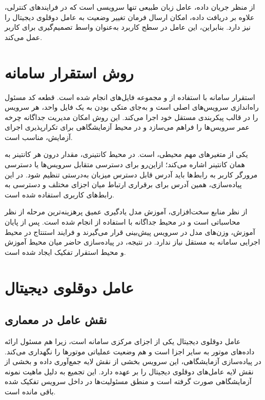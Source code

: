 از منظر جریان داده، عامل زبان طبیعی تنها سرویسی است که در فرایندهای کنترلی، علاوه بر دریافت داده، امکان ارسال فرمان تغییر وضعیت به عامل دوقلوی دیجیتال را نیز دارد. بنابراین، این عامل در سطح کاربرد به‌عنوان واسط تصمیم‌گیری برای کاربر عمل می‌کند.



\section{روش استقرار سامانه}
\label{sec:deployment}

استقرار سامانه با استفاده از  و مجموعه فایل‌های  انجام شده است. قطعه کد  مسئول راه‌اندازی سرویس‌های اصلی است و به‌جای متکی بودن به یک فایل واحد، هر سرویس را در قالب پیکربندی مستقل خود اجرا می‌کند. این روش امکان مدیریت جداگانه چرخه عمر سرویس‌ها را فراهم می‌سازد و در محیط آزمایشگاهی برای تکرارپذیری اجرای آزمایش، مناسب است.

یکی از متغیرهای مهم محیطی،  است. در محیط کانتینری، مقدار  درون هر کانتینر به همان کانتینر اشاره می‌کند؛ ازاین‌رو برای دسترسی متقابل سرویس‌ها یا دسترسی مرورگر کاربر به رابط‌ها باید آدرس قابل دسترس میزبان به‌درستی تنظیم شود. در این پیاده‌سازی، همین آدرس برای برقراری ارتباط میان اجزای مختلف و دسترسی به رابط‌های کاربری استفاده شده است.

از نظر منابع سخت‌افزاری، آموزش مدل یادگیری عمیق پرهزینه‌ترین مرحله از نظر محاسباتی است و در محیط جداگانه با استفاده از  انجام شده است. پس از پایان آموزش، وزن‌های مدل در سرویس پیش‌بینی قرار می‌گیرند و فرایند استنتاج در محیط اجرایی سامانه به  مستقل نیاز ندارد. در نتیجه، در پیاده‌سازی حاضر میان محیط آموزش و محیط استقرار تفکیک ایجاد شده‌ است.


\section{عامل دوقلوی دیجیتال}
\label{sec:impl-dtwin}

\subsection{نقش عامل در معماری}

عامل دوقلوی دیجیتال یکی از اجزای مرکزی سامانه است، زیرا هم مسئول ارائه داده‌های موتور به سایر اجزا است و هم وضعیت عملیاتی موتورها را نگهداری می‌کند. در پیاده‌سازی آزمایشگاهی، این سرویس بخشی از نقش لایه جمع‌آوری داده و بخشی از نقش لایه عامل‌های دوقلوی دیجیتال را بر عهده دارد. این تجمیع به دلیل ماهیت نمونه آزمایشگاهی صورت گرفته است و منطق مسئولیت‌ها در داخل سرویس تفکیک شده باقی مانده است.

